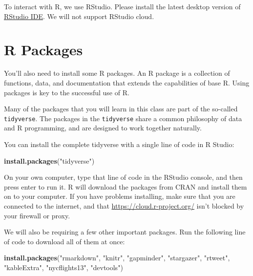 \documentclass[]{book}
\newenvironment{Shaded}{\begin{snugshade}}{\end{snugshade}}
\newcommand{\KeywordTok}[1]{\textcolor[rgb]{0.13,0.29,0.53}{\textbf{#1}}}
\newcommand{\StringTok}[1]{\textcolor[rgb]{0.31,0.60,0.02}{#1}}
\newcommand{\NormalTok}[1]{#1}
\begin{document}
To interact with R, we use RStudio. Please install the latest desktop
version of \href{http://www.rstudio.com/ide/download/desktop}{RStudio
IDE}. We will not support RStudio cloud.

\section{R Packages}\label{r-packages}

You'll also need to install some R packages. An R package is a
collection of functions, data, and documentation that extends the
capabilities of base R. Using packages is key to the successful use of
R.

Many of the packages that you will learn in this class are part of the
so-called \texttt{tidyverse}. The packages in the \texttt{tidyverse}
share a common philosophy of data and R programming, and are designed to
work together naturally.

You can install the complete tidyverse with a single line of code in R
Studio:

\begin{Shaded}
\begin{Highlighting}[]
\KeywordTok{install.packages}\NormalTok{(}\StringTok{"tidyverse"}\NormalTok{)}
\end{Highlighting}
\end{Shaded}

On your own computer, type that line of code in the RStudio console, and
then press enter to run it. R will download the packages from CRAN and
install them on to your computer. If you have problems installing, make
sure that you are connected to the internet, and that
\url{https://cloud.r-project.org/} isn't blocked by your firewall or
proxy.

We will also be requiring a few other important packages. Run the
following line of code to download all of them at once:

\begin{Shaded}
\begin{Highlighting}[]
\KeywordTok{install.packages}\NormalTok{(}\StringTok{"rmarkdown"}\NormalTok{, }\StringTok{"knitr"}\NormalTok{, }\StringTok{"gapminder"}\NormalTok{, }
                 \StringTok{"stargazer"}\NormalTok{, }\StringTok{"rtweet"}\NormalTok{, }\StringTok{"kableExtra"}\NormalTok{,}
                 \StringTok{"nycflights13"}\NormalTok{, }\StringTok{"devtools"}\NormalTok{)}
\end{Highlighting}
\end{Shaded}
\end{document}
